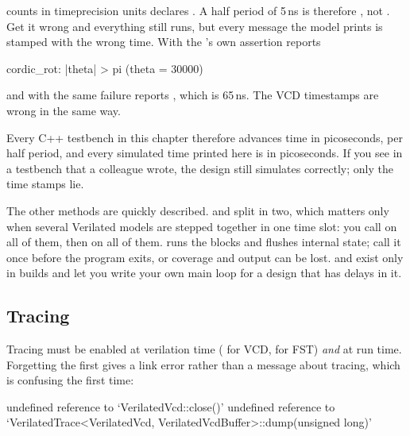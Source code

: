 \begin{gotcha}{ counts in timeprecision units}
 declares . A half period of
5\,ns is therefore , not . Get it
wrong and everything still runs, but every message the model prints is stamped
with the wrong time. With  the \DUT{}'s own assertion reports
\begin{txtcode}
[0] %
    cordic_rot: |theta| > pi (theta = 30000)
\end{txtcode}
and with  the same failure reports \code{[65000]}, which is
65\,ns. The VCD timestamps are wrong in the same way.

Every C++ testbench in this chapter therefore advances time in picoseconds,
 per half period, and every simulated time printed here is
in picoseconds. If you see  in a testbench that a colleague
wrote, the design still simulates correctly; only the time stamps lie.
\end{gotcha}

The other methods are quickly described.  and
 split  in two, which matters only when
several Verilated models are stepped together in one time slot: you call
 on all of them, then  on all of
them.  runs the \SV{}  blocks and flushes internal
state; call it once before the program exits, or coverage and 
output can be lost.  and  exist only
in  builds and let you write your own main loop for a design
that has delays in it.

\subsection{Tracing}

Tracing must be enabled at verilation time
( for VCD,  for FST) \emph{and} at run
time. Forgetting the first gives a link error rather than a message about
tracing, which is confusing the first time:

\begin{txtcode}
undefined reference to `VerilatedVcd::close()'
undefined reference to `VerilatedTrace<VerilatedVcd,
                        VerilatedVcdBuffer>::dump(unsigned long)'
\end{txtcode}

